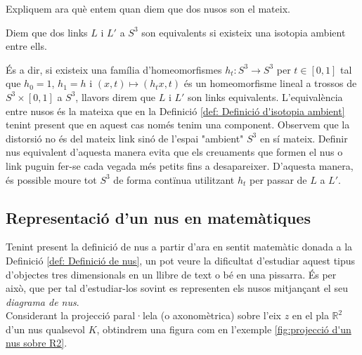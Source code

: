 Expliquem ara què entem quan diem que dos nusos son el mateix.

\begin{definition}\label{def: Definició d'isotopia ambient}
	Diem que dos links $L$ i $L'$ a $S^3$ son equivalents si existeix una isotopia ambient entre ells.
\end{definition}
És a dir, si existeix una família d'homeomorfismes $h_t:S^3\rightarrow S^3$ per $t\in[0, 1]$ tal que $h_0=1$, $h_1=h$ i $(x, t)\mapsto(h_{t}x, t)$ és un homeomorfisme lineal a trossos de $S^3\times[0, 1]$ a $S^3$, llavors direm que $L$ i $L'$ son links equivalents. L'equivalència entre nusos és la mateixa que en la Definició \ref{def: Definició d'isotopia ambient} tenint present que en aquest cas només tenim una component. Observem que la distorsió no és del mateix link sinó de l'espai "ambient" $S^3$ en sí mateix. Definir nus equivalent d'aquesta manera evita que els creuaments que formen el nus o link puguin fer-se cada vegada més petits fins a desapareixer. D'aquesta manera, és possible moure tot $S^3$ de forma contïnua utilitzant $h_t$ per passar de $L$ a $L'$.

\subsection{Representació d'un nus en matemàtiques}\label{sec:Representació de nus}
Tenint present la definició de nus a partir d'ara en sentit matemàtic donada a la Definició \ref{def: Definició de nus}, un pot veure la dificultat d'estudiar aquest tipus d'objectes tres dimensionals en un llibre de text o bé en una pissarra. És per això, que per tal d'estudiar-los sovint es representen els nusos mitjançant el seu \textit{diagrama de nus}.\\

Considerant la projecció paral·lela (o axonomètrica) sobre l'eix $z$ en el pla $\mathbb{R}^2$ d'un nus qualsevol $K$, obtindrem una figura com en l'exemple \ref{fig:projecció d'un nus sobre R2}.\\

